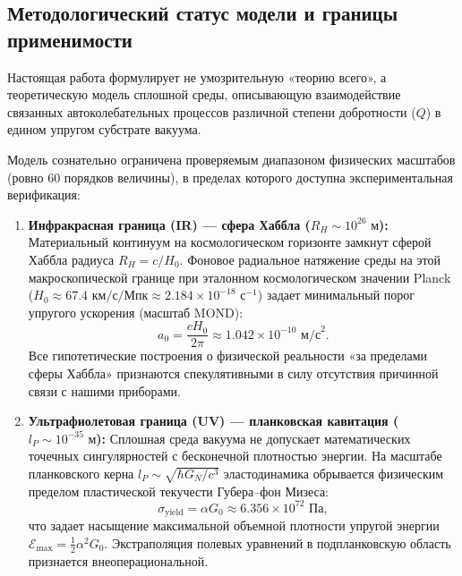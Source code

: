 \documentclass[11pt,a4paper]{article}
\theoremstyle{definition}
\theoremstyle{remark}
\begin{document}
\subsection{Методологический статус модели и границы применимости}

Настоящая работа формулирует не умозрительную «теорию всего», а теоретическую модель сплошной среды, описывающую взаимодействие связанных автоколебательных процессов различной степени добротности ($Q$) в едином упругом субстрате вакуума.

Модель сознательно ограничена проверяемым диапазоном физических масштабов (ровно 60 порядков величины), в пределах которого доступна экспериментальная верификация:

\begin{enumerate}
\item \textbf{Инфракрасная граница (IR) --- сфера Хаббла ($R_H \sim 10^{26}\text{ м}$):}
Материальный континуум на космологическом горизонте замкнут сферой Хаббла радиуса $R_H = c / H_0$. Фоновое радиальное натяжение среды на этой макроскопической границе при эталонном космологическом значении Planck ($H_0 \approx 67.4\text{ км/с/Мпк} \approx 2.184 \times 10^{-18}\text{ с}^{-1}$) задает минимальный порог упругого ускорения (масштаб MOND):
\begin{equation}
a_0 = \frac{c H_0}{2\pi} \approx 1.042 \times 10^{-10}\text{ м/с}^2.
\label{eq:mond_acceleration_exact}
\end{equation}
Все гипотетические построения о физической реальности «за пределами сферы Хаббла» признаются спекулятивными в силу отсутствия причинной связи с нашими приборами.

\item \textbf{Ультрафиолетовая граница (UV) --- планковская кавитация ($l_P \sim 10^{-35}\text{ м}$):}
Сплошная среда вакуума не допускает математических точечных сингулярностей с бесконечной плотностью энергии. На масштабе планковского керна $l_P \sim \sqrt{\hbar G_N / c^3}$ эластодинамика обрывается физическим пределом пластической текучести Губера--фон Мизеса:
\begin{equation}
\sigma_{\mathrm{yield}} = \alpha G_0 \approx 6.356 \times 10^{72}\text{ Па},
\label{eq:mises_yield_cutoff}
\end{equation}
что задает насыщение максимальной объемной плотности упругой энергии $\mathcal{E}_{\mathrm{max}} = \frac{1}{2}\alpha^2 G_0$. Экстраполяция полевых уравнений в подпланковскую область признается внеоперациональной.
\end{enumerate}
\end{document}

